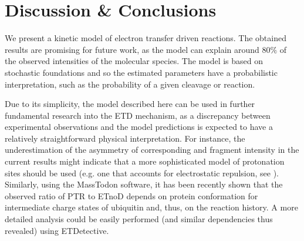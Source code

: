 \documentclass{llncs}
\begin{document}
\section{Discussion \& Conclusions}
We present a kinetic model of electron transfer driven reactions. The obtained results are promising for future work, as the model can explain around $80\%$ of the observed intensities of the molecular species. The model is based on stochastic foundations and so the estimated parameters have a probabilistic interpretation, such as the probability of a given cleavage or reaction.

Due to its simplicity, the model described here can be used in further fundamental research into the ETD mechanism, as a discrepancy between experimental observations and the model predictions is expected to have a relatively straightforward physical interpretation. For instance, the underestimation of the asymmetry of corresponding  and  fragment intensity in the current results might indicate that a more sophisticated model of protonation sites should be used (e.g. one that accounts for electrostatic repulsion, see \cite{Morrison2016-wc}). Similarly, using the {\sc MassTodon} software, it has been recently shown \cite{Lermyte2017-zt} that the observed ratio of PTR to ETnoD depends on protein conformation for intermediate charge states of ubiquitin and, thus, on the reaction history. A more detailed analysis could be easily performed (and similar dependencies thus revealed) using ETDetective.

\end{document}
